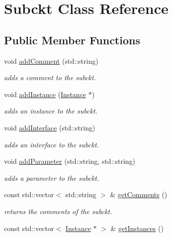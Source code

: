 \hypertarget{class_s_p_i_c_e_1_1_subckt}{\section{Subckt Class Reference}
\label{class_s_p_i_c_e_1_1_subckt}
}
\subsection*{Public Member Functions}
\begin{DoxyCompactItemize}
\item 
void \hyperlink{class_s_p_i_c_e_1_1_subckt_a6c590c1d92248d6e5f95ea6c470fbb5a}{add\-Comment} (std\-::string)
\begin{DoxyCompactList}\small\item\em adds a comment to the subckt. \end{DoxyCompactList}\item 
void \hyperlink{class_s_p_i_c_e_1_1_subckt_a7bb4a4532643568ab1ac2c229185a88e}{add\-Instance} (\hyperlink{class_s_p_i_c_e_1_1_instance}{Instance} $\ast$)
\begin{DoxyCompactList}\small\item\em adds an instance to the subckt. \end{DoxyCompactList}\item 
void \hyperlink{class_s_p_i_c_e_1_1_subckt_ac162264683fa3d9b3384d3e8cc291fa2}{add\-Interface} (std\-::string)
\begin{DoxyCompactList}\small\item\em adds an interface to the subckt. \end{DoxyCompactList}\item 
void \hyperlink{class_s_p_i_c_e_1_1_subckt_ab3ab147a16bc490ce96db905a4ca271c}{add\-Parameter} (std\-::string, std\-::string)
\begin{DoxyCompactList}\small\item\em adds a parameter to the subckt. \end{DoxyCompactList}\item 
const std\-::vector$<$ std\-::string $>$ \& \hyperlink{class_s_p_i_c_e_1_1_subckt_aa4a73ef909ceb8d442ed2f205967613a}{get\-Comments} ()
\begin{DoxyCompactList}\small\item\em returns the comments of the subckt. \end{DoxyCompactList}\item 
\hypertarget{class_s_p_i_c_e_1_1_subckt_a8e6e58ffab876152a740092520c35d73}{const std\-::vector$<$ \hyperlink{class_s_p_i_c_e_1_1_instance}{Instance} $\ast$ $>$ \& \hyperlink{class_s_p_i_c_e_1_1_subckt_a8e6e58ffab876152a740092520c35d73}{get\-Instances} ()}\label{class_s_p_i_c_e_1_1_subckt_a8e6e58ffab876152a740092520c35d73}


\end{DoxyCompactItemize}
